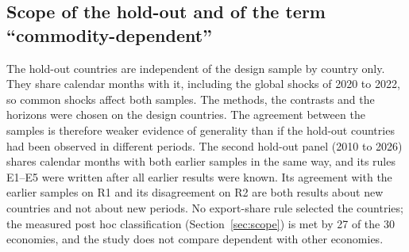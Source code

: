 \subsection{Scope of the hold-out and of the term ``commodity-dependent''}

The hold-out countries are independent of the design sample by country only. They share calendar months with it, including the global shocks of 2020 to 2022, so common shocks affect both samples. The methods, the contrasts and the horizons were chosen on the design countries. The agreement between the samples is therefore weaker evidence of generality than if the hold-out countries had been observed in different periods. The second hold-out panel (2010 to 2026) shares calendar months with both earlier samples in the same way, and its rules E1--E5 were written after all earlier results were known. Its agreement with the earlier samples on R1 and its disagreement on R2 are both results about new countries and not about new periods. No export-share rule selected the countries; the measured post hoc classification (Section~\ref{sec:scope}) is met by 27 of the 30 economies, and the study does not compare dependent with other economies.

